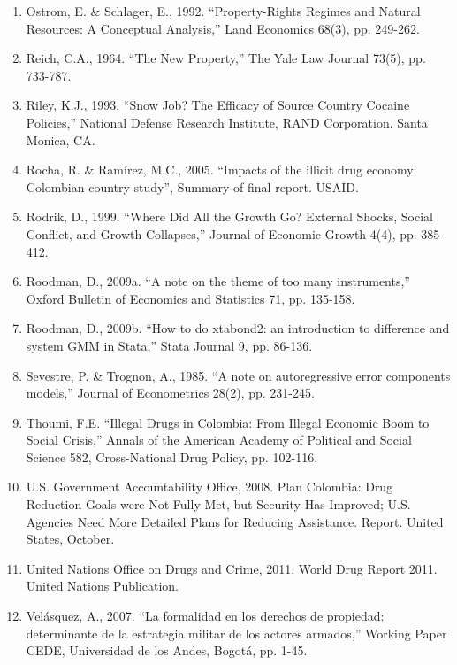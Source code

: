\begin{enumerate}
\item Ostrom, E. \& Schlager, E., 1992. ``Property-Rights Regimes and Natural Resources: A Conceptual Analysis,'' Land Economics 68(3), pp. 249-262.

\item Reich, C.A., 1964. ``The New Property,'' The Yale Law Journal 73(5), pp. 733-787.

\item Riley, K.J., 1993. ``Snow Job? The Efficacy of Source Country Cocaine Policies,'' National Defense Research Institute, RAND Corporation. Santa Monica, CA.

\item Rocha, R. \& Ram\'{i}rez, M.C., 2005. ``Impacts of the illicit drug economy: Colombian country study'', Summary of final report. USAID.

\item Rodrik, D., 1999. ``Where Did All the Growth Go? External Shocks, Social Conflict, and Growth Collapses,'' Journal of Economic Growth 4(4), pp. 385-412.

\item Roodman, D., 2009a. ``A note on the theme of too many instruments,'' Oxford Bulletin of Economics and Statistics 71, pp. 135-158.

 \item Roodman, D., 2009b. ``How to do xtabond2: an introduction to difference and system GMM in Stata,'' Stata Journal 9, pp. 86-136.

 \item Sevestre, P. \& Trognon, A., 1985. ``A note on autoregressive error components models,'' Journal of Econometrics 28(2), pp. 231-245.

\item  Thoumi, F.E. ``Illegal Drugs in Colombia: From Illegal Economic Boom to Social Crisis,'' Annals of the American Academy of Political and Social Science 582, Cross-National Drug Policy, pp. 102-116.

 \item U.S. Government Accountability Office, 2008. Plan Colombia: Drug Reduction Goals were Not Fully Met, but Security Has Improved; U.S. Agencies Need More Detailed Plans for Reducing Assistance. Report. United States, October.

\item United Nations Office on Drugs and Crime, 2011. World Drug Report 2011. United Nations Publication.

\item Vel\'{a}squez, A., 2007. ``La formalidad en los derechos de propiedad: determinante de la estrategia militar de los actores armados,'' Working Paper CEDE, Universidad de los Andes, Bogot\'{a}, pp. 1-45.


\end{enumerate}
